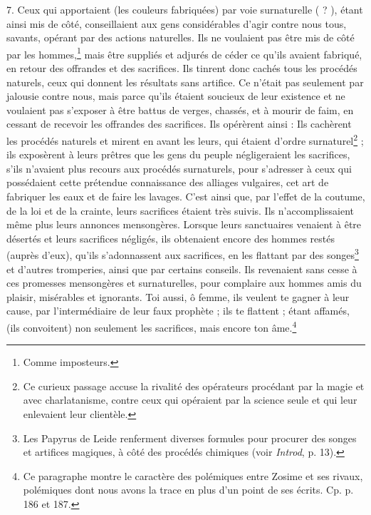 \documentclass[a4paper, 11pt, oneside, polutonikogreek, french]{article}
\begin{document}
7. Ceux qui apportaient (les couleurs fabriquées) par voie surnaturelle ( ? ), étant ainsi mis de côté, conseillaient aux gens considérables d'agir contre nous tous, savants, opérant par des actions naturelles. Ils ne voulaient pas être mis de côté par les hommes,\footnote{Comme imposteurs.} mais être suppliés et adjurés de céder ce qu'ils avaient fabriqué, en retour des offrandes et des sacrifices. Ils tinrent donc cachés tous les procédés naturels, ceux qui donnent les résultats sans artifice. Ce n'était pas seulement par jalousie contre nous, mais parce qu'ils étaient soucieux de leur existence et ne voulaient pas s'exposer à être battus de verges, chassés, et à mourir de faim, en cessant de recevoir les offrandes des sacrifices. Ils opérèrent ainsi : Ils cachèrent les procédés naturels et mirent en avant les leurs, qui étaient d'ordre surnaturel\footnote{Ce curieux passage accuse la rivalité des opérateurs procédant par la magie et avec charlatanisme, contre ceux qui opéraient par la science seule et qui leur enlevaient leur clientèle.} ; ils exposèrent à leurs prêtres que les gens du peuple négligeraient les sacrifices, s'ils n'avaient plus recours aux procédés surnaturels, pour s'adresser à ceux qui possédaient cette prétendue connaissance des alliages vulgaires, cet art de fabriquer les eaux et de faire les lavages. C'est ainsi que, par l'effet de la coutume, de la loi et de la crainte, leurs sacrifices étaient très suivis. Ils n'accomplissaient même plus leurs annonces mensongères. Lorsque leurs sanctuaires venaient à être désertés et leurs sacrifices négligés, ils obtenaient encore des hommes restés (auprès d'eux), qu'ils s'adonnassent aux sacrifices, en les flattant par des songes\footnote{Les Papyrus de Leide renferment diverses formules pour procurer des songes et artifices magiques, à côté des procédés chimiques (voir \emph{Introd}, p. 13).} et d'autres tromperies, ainsi que par certains conseils. Ils revenaient sans cesse à ces promesses mensongères et surnaturelles, pour complaire aux hommes amis du plaisir, misérables et ignorants. Toi aussi, ô femme, ils veulent te gagner à leur cause, par l'intermédiaire de leur faux prophète ; ils te flattent ; étant affamés, (ils convoitent) non seulement les sacrifices, mais encore ton âme.\footnote{Ce paragraphe montre le caractère des polémiques entre Zosime et ses rivaux, polémiques dont nous avons la trace en plus d'un point de ses écrits. Cp. p. 186 et 187.}
\end{document}
